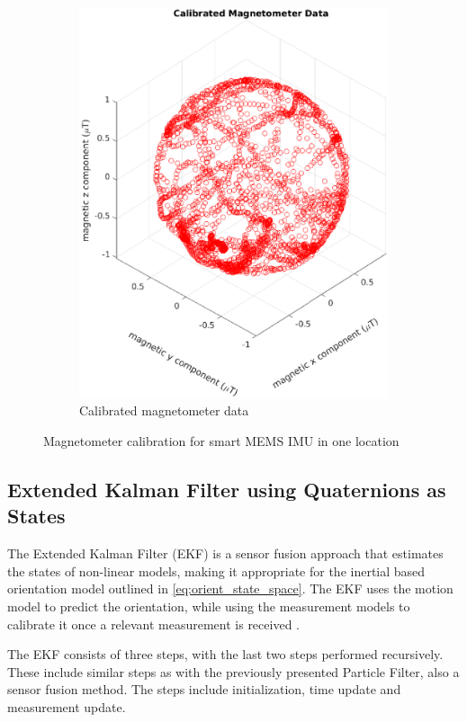 \begin{figure}[H]
\begin{subfigure}[t]{0.45\textwidth}
		\includegraphics[trim=80 0 80 0, clip,width=1.1\linewidth]{images/20201020_1125_Calibrated_Magnetometer_Data}
		\caption{ Calibrated magnetometer data}
		\label{fig:calibrated_magnetometer_data}
	\end{subfigure}
	\caption{Magnetometer calibration for smart MEMS \ac{IMU} in one location}
	\label{fig:calibration_magnetometer}
\end{figure}



\subsection{Extended Kalman Filter using Quaternions as States}
\label{sec:rw-EKF}

The Extended Kalman Filter (EKF) is a sensor fusion approach that estimates the states of non-linear models, making it appropriate for the inertial based orientation model outlined in \eqref{eq:orient_state_space}. The EKF uses the motion model to predict the orientation, while using the measurement models to calibrate it once a relevant measurement is received \cite{Kok2017}. \par 
The EKF consists of three steps, with the last two steps performed recursively.  These include similar steps as with the previously presented Particle Filter, also a sensor fusion method. The steps include initialization, time update and measurement update. \par 


